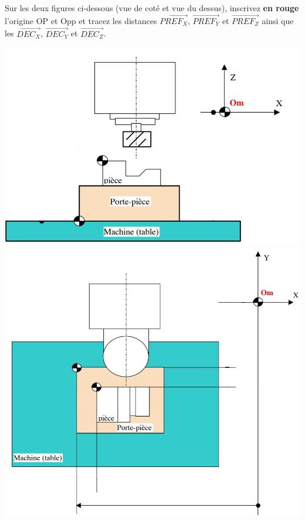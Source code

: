 \documentclass[12pt]{article}
\newcounter{exo}
\newenvironment{exo}{\stepcounter{exo}\vspace{0.5cm}{\bfseries Question \theexo\ :}}{\par\vspace{0.5cm}}
\begin{document}
\begin{exo}\label{exo1} Sur les deux figures ci-dessous (vue de coté et vue du dessus), inscrivez \textbf{en rouge} l'origine OP et Opp et tracez les distances $\overrightarrow{PREF_X}$, $\overrightarrow{PREF_Y}$ et $\overrightarrow{PREF_Z}$ ainsi que les $\overrightarrow{DEC_X}$, $\overrightarrow{DEC_Y}$ et $\overrightarrow{DEC_Z}$.\end{exo}
\begin{center}
\includegraphics[width=0.8\linewidth]{DEC1.JPG}
\includegraphics[width=0.85\linewidth]{DEC2.JPG}
\end{center}
\end{document}

